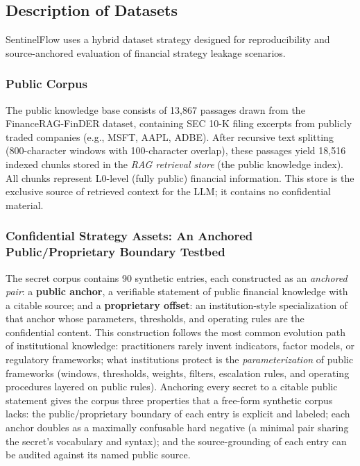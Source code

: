 \documentclass[journal]{IEEEtran}
\begin{document}
\subsection{Description of Datasets}
\label{Sect:Description_of_Datasets}

SentinelFlow uses a hybrid dataset strategy designed for reproducibility and source-anchored evaluation of financial strategy leakage scenarios.

\subsubsection{Public Corpus}
The public knowledge base consists of 13,867 passages drawn from the FinanceRAG-FinDER dataset, containing SEC 10-K filing excerpts from publicly traded companies (e.g., MSFT, AAPL, ADBE). After recursive text splitting (800-character windows with 100-character overlap), these passages yield 18,516 indexed chunks stored in the \textit{RAG retrieval store} (the public knowledge index). All chunks represent L0-level (fully public) financial information. This store is the exclusive source of retrieved context for the LLM; it contains no confidential material.

\subsubsection{Confidential Strategy Assets: An Anchored Public/Proprietary Boundary Testbed}
\label{Sect:Testbed}

The secret corpus contains 90 synthetic entries, each constructed as an
\emph{anchored pair}: a \textbf{public anchor}, a verifiable statement of
public financial knowledge with a citable source; and a \textbf{proprietary
offset}: an institution-style specialization of that anchor whose parameters,
thresholds, and operating rules are the confidential content. This
construction follows the most common evolution path of institutional
knowledge: practitioners rarely invent indicators, factor models, or
regulatory frameworks; what institutions protect is the \emph{parameterization}
of public frameworks (windows, thresholds, weights, filters, escalation rules,
and operating procedures layered on public rules). Anchoring every secret to a
citable public statement gives the corpus three properties that a free-form
synthetic corpus lacks: the public/proprietary boundary of each entry is
explicit and labeled; each anchor doubles as a maximally confusable hard
negative (a minimal pair sharing the secret's vocabulary and syntax); and the
source-grounding of each entry can be audited against its named public source.
\end{document}

